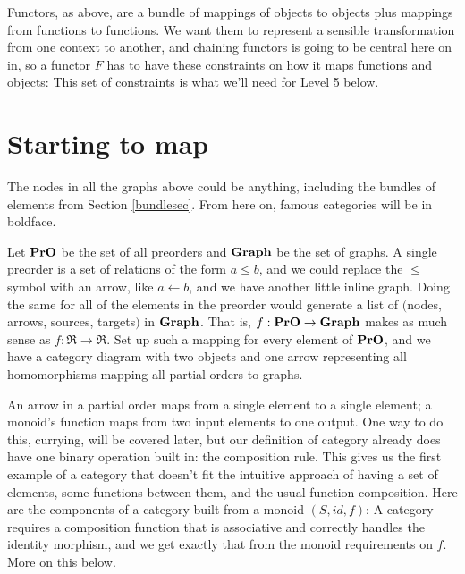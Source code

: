 \documentclass[11pt]{article}
\begin{document}
Functors, as above, are a bundle of mappings of objects to objects plus mappings from
functions to functions. We want them to represent a sensible transformation from one
context to another, and chaining functors is going to be central here on in, so a
functor $F$ has to have these constraints on how it maps functions and objects:
This set of constraints is what we'll need for Level 5 below.

\section{Starting to map}
The nodes in all the graphs above could be anything, including the bundles of elements from
Section \ref{bundlesec}. From here on, famous categories will be in boldface.

Let ${\bf PrO}$ be the set of all preorders and ${\bf Graph}$ be the set of graphs. A
single preorder is a set of relations of the form $a \leq b$, and we could replace the $\leq$
symbol with an arrow, like $a\leftarrow b$, and we have another little inline graph. 
Doing the same for all of the elements in the preorder would generate a list of
$($nodes, arrows, sources, targets$)$ in ${\bf Graph}$.
That is, $f:{\bf PrO}\to {\bf Graph}$ makes as much sense as $f:\Re \to \Re$. Set up such
a mapping for every element of ${\bf PrO}$, and we have a category diagram with two
objects and one arrow representing all homomorphisms mapping all partial orders to graphs.

An arrow in a partial order maps from a single element to a single element; a monoid's
function maps from two input elements to one output. One way to do this, currying, will be
covered later, but our definition of category already does have one binary operation
built in: the composition rule. This gives us the first example of a category that
doesn't fit the intuitive approach of having a set of elements, some functions between
them, and the usual function composition. Here are the components of a category built
from a monoid $(S, id, f)$:
A category requires a composition function that is associative and correctly handles the
identity morphism, and we get exactly that from the monoid requirements on $f$. More on
this below.
\end{document}
